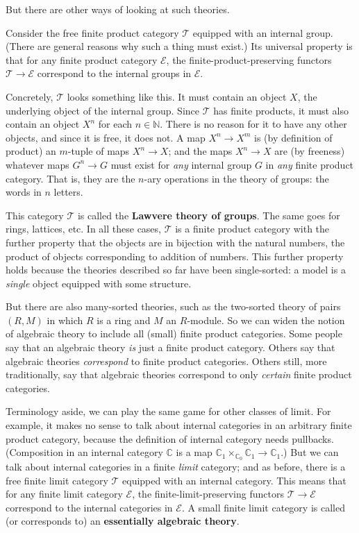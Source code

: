 \documentclass{article}
\newcommand{\cat}[1]{\mathscr{#1}}
\newcommand{\demph}[1]{\textbf{\textup{#1}}}
\newcommand{\scat}[1]{\mathbb{#1}}
\newcommand{\nat}{\mathbb{N}}
\newcommand{\E}{\cat{E}}
\newcommand{\T}{\cat{T}}
\begin{document}
But there are other ways of looking at such theories.  

Consider the free finite product category $\T$ equipped with an internal
group.  (There are general reasons why such a thing must exist.)  Its
universal property is that for any finite product category $\E$, the
finite-product-preserving functors $\T \to \E$ correspond to the internal
groups in $\E$.

Concretely, $\T$ looks something like this.  It must contain an object $X$,
the underlying object of the internal group.  Since $\T$ has finite
products, it must also contain an object $X^n$ for each $n \in \nat$.  There
is no reason for it to have any other objects, and since it is free, it does
not.  A map $X^n \to X^m$ is (by definition of product) an $m$-tuple of maps
$X^n \to X$; and the maps $X^n \to X$ are (by freeness) whatever maps $G^n \to
G$ must exist for \emph{any} internal group $G$ in \emph{any} finite product
category.  That is, they are the $n$-ary operations in the theory of groups:
the words in $n$ letters.

This category $\T$ is called the \demph{Lawvere theory of groups}.  The same
goes for rings, lattices, etc.  In all these cases, $\T$ is a finite product
category with the further property that the objects are in bijection with the
natural numbers, the product of objects corresponding to addition of numbers.
This further property holds because the theories described so far have been
single-sorted: a model is a \emph{single} object equipped with some structure.

But there are also many-sorted theories, such as the two-sorted theory of
pairs $(R, M)$ in which $R$ is a ring and $M$ an $R$-module.  So we can widen
the notion of algebraic theory to include all (small) finite product
categories.  Some people say that an algebraic theory \emph{is} just a finite
product category.  Others say that algebraic theories \emph{correspond}
to finite product categories.  Others still, more traditionally, say that
algebraic theories correspond to only \emph{certain} finite product
categories.

Terminology aside, we can play the same game for other classes of limit.  For
example, it makes no sense to talk about internal categories in an arbitrary
finite product category, because the definition of internal category needs
pullbacks.  (Composition in an internal category $\scat{C}$ is a map
$\scat{C}_1 \times_{\scat{C}_0} \scat{C}_1 \to \scat{C}_1$.)  But we can talk
about internal categories in a finite \emph{limit} category; and as before,
there is a free finite limit category $\T$ equipped with an internal category.
This means that for any finite limit category $\E$, the
finite-limit-preserving functors $\T \to \E$ correspond to the internal
categories in $\E$.  A small finite limit category is called (or corresponds
to) an \demph{essentially algebraic theory}.
\end{document}
